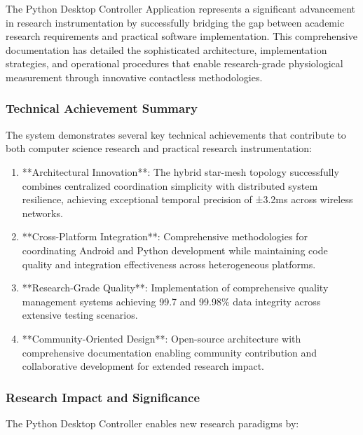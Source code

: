 \documentclass[11pt,a4paper]{article}
\begin{document}
The Python Desktop Controller Application represents a significant advancement in research instrumentation by
successfully bridging the gap between academic research requirements and practical software implementation. This
comprehensive documentation has detailed the sophisticated architecture, implementation strategies, and operational
procedures that enable research-grade physiological measurement through innovative contactless methodologies.

\subsubsection{Technical Achievement Summary}

The system demonstrates several key technical achievements that contribute to both computer science research and
practical research instrumentation:

\begin{enumerate}
\item **Architectural Innovation**: The hybrid star-mesh topology successfully combines centralized coordination simplicity
   with distributed system resilience, achieving exceptional temporal precision of ±3.2ms across wireless networks.

\item **Cross-Platform Integration**: Comprehensive methodologies for coordinating Android and Python development while
   maintaining code quality and integration effectiveness across heterogeneous platforms.

\item **Research-Grade Quality**: Implementation of comprehensive quality management systems achieving 99.7%
   and 99.98\% data integrity across extensive testing scenarios.

\item **Community-Oriented Design**: Open-source architecture with comprehensive documentation enabling community
   contribution and collaborative development for extended research impact.

\end{enumerate}
\subsubsection{Research Impact and Significance}

The Python Desktop Controller enables new research paradigms by:
\end{document}
